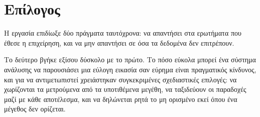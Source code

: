 \section{Επίλογος}

Η εργασία επιδίωξε δύο πράγματα ταυτόχρονα: να απαντήσει στα ερωτήματα που
έθεσε η επιχείρηση, και να μην απαντήσει σε όσα τα δεδομένα δεν επιτρέπουν.

Το δεύτερο βγήκε εξίσου δύσκολο με το πρώτο. Το πόσο εύκολα μπορεί ένα σύστημα
ανάλυσης να παρουσιάσει μια εύλογη εικασία σαν εύρημα είναι πραγματικός
κίνδυνος, και για να αντιμετωπιστεί χρειάστηκαν συγκεκριμένες σχεδιαστικές
επιλογές: να χωρίζονται τα μετρούμενα από τα υποτιθέμενα μεγέθη, να ταξιδεύουν
οι παραδοχές μαζί με κάθε αποτέλεσμα, και να δηλώνεται ρητά το μη ορισμένο εκεί
όπου ένα μέγεθος δεν ορίζεται.
